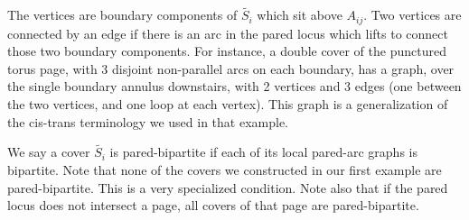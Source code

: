 \documentclass[12pt]{amsart}
\theoremstyle{definition}
\begin{document}
The vertices are boundary components of $\widetilde{S_i}$ which sit above
$A_{ij}$. Two vertices are connected by an edge if there is an arc in the pared
locus which lifts to connect those two boundary components. For instance,
a double cover of the punctured torus page, with 3 disjoint non-parallel arcs
on each boundary, has a graph, over the single boundary annulus downstairs,
with 2 vertices and 3 edges (one between the two vertices, and one loop at each
vertex). This graph is a generalization of the cis-trans terminology we used in
that example.

We say a cover $\widetilde{S_i}$ is pared-bipartite if each of its local
pared-arc graphs is bipartite. Note that none of the covers we constructed in
our first example are pared-bipartite. This is a very specialized condition.
Note also that if the pared locus does not intersect a page, all covers of that
page are pared-bipartite.
\end{document}

